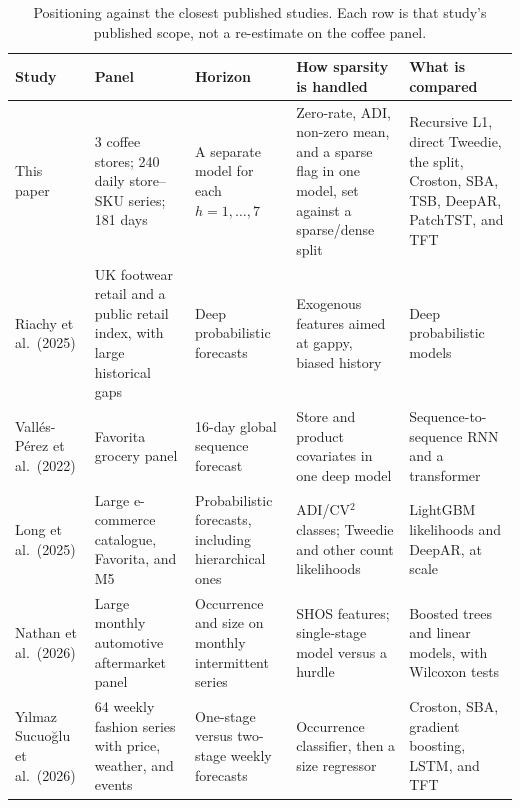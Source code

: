 \documentclass[review,authoryear]{elsarticle}
\begin{document}
\begin{table}[H]
    \centering
    \caption{Positioning against the closest published studies. Each row is that study's published scope, not a re-estimate on the coffee panel.}
    \label{tab:positioning}
    \footnotesize
    \setlength{\tabcolsep}{3pt}
    \begin{tabular}{@{}p{}p{}p{}p{}p{}@{}}
        \toprule
        Study & Panel & Horizon & How sparsity is handled & What is compared \\
        \midrule
        This paper &
        3 coffee stores; 240 daily store--SKU series; 181 days &
        A separate model for each $h=1,\ldots,7$ &
        Zero-rate, ADI, non-zero mean, and a sparse flag in one model, set against a sparse/dense split &
        Recursive L1, direct Tweedie, the split, Croston, SBA, TSB, DeepAR, PatchTST, and TFT \\
        \addlinespace
        Riachy et al.\ (2025) &
        UK footwear retail and a public retail index, with large historical gaps &
        Deep probabilistic forecasts &
        Exogenous features aimed at gappy, biased history &
        Deep probabilistic models \\
        \addlinespace
        Vall\'es-P\'erez et al.\ (2022) &
        Favorita grocery panel &
        16-day global sequence forecast &
        Store and product covariates in one deep model &
        Sequence-to-sequence RNN and a transformer \\
        \addlinespace
        Long et al.\ (2025) &
        Large e-commerce catalogue, Favorita, and M5 &
        Probabilistic forecasts, including hierarchical ones &
        ADI/CV$^{2}$ classes; Tweedie and other count likelihoods &
        LightGBM likelihoods and DeepAR, at scale \\
        \addlinespace
        Nathan et al.\ (2026) &
        Large monthly automotive aftermarket panel &
        Occurrence and size on monthly intermittent series &
        SHOS features; single-stage model versus a hurdle &
        Boosted trees and linear models, with Wilcoxon tests \\
        \addlinespace
        Y{\i}lmaz Sucuo{\u{g}}lu et al.\ (2026) &
        64 weekly fashion series with price, weather, and events &
        One-stage versus two-stage weekly forecasts &
        Occurrence classifier, then a size regressor &
        Croston, SBA, gradient boosting, LSTM, and TFT \\
        \bottomrule
    \end{tabular}
\end{table}
\end{document}
